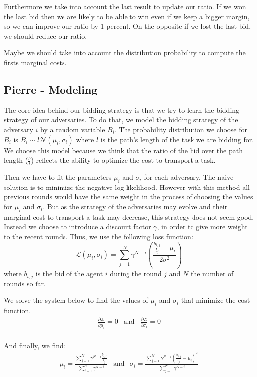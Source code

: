 \documentclass[11pt]{article}
\begin{document}
Furthermore we take into account the last result to update our ratio. If we won the last bid then we are likely to be able to win even if we keep a bigger margin, so we can improve our ratio by 1 percent. On the opposite if we lost the last bid, we should reduce our ratio.

Maybe we should take into account the distribution probability to compute the firsts marginal costs.

\subsection{Pierre - Modeling}

The core idea behind our bidding strategy is that we try to learn the bidding strategy of our adversaries. To do that, we model the bidding strategy of the adversary $i$ by a random variable $B_i$. The probability distribution we choose for $B_i$ is $B_i \sim l\mathcal{N}(\mu_i, \sigma_i)$ where $l$ is the path's length of the task we are bidding for. We choose this model because we think that the ratio of the bid over the path length ($\frac{b}{l}$) reflects the ability to optimize the cost to transport a task.

Then we have to fit the parameters $\mu_i$ and $\sigma_i$ for each adversary. The naive solution is to minimize the negative log-likelihood. However with this method all previous rounds would have the same weight in the process of choosing the values for $\mu_i$ and $\sigma_i$. But as the strategy of the adversaries may evolve and their marginal cost to transport a task may decrease, this strategy does not seem good. Instead we choose to introduce a discount factor $\gamma$, in order to give more weight to the recent rounds. Thus, we use the following loss function:
$$
\mathcal{L}(\mu_i, \sigma_i) = \sum_{j=1}^{N}{\gamma^{N-i}\left(\frac{\frac{b_{i,j}}{l_j} - \mu_i}{2\sigma^2}\right)}
$$
where $b_{i,j}$ is the bid of the agent $i$ during the round $j$ and $N$ the number of rounds so far.

We solve the system below to find the values of $\mu_i$ and $\sigma_i$ that minimize the cost function.
$$
\begin{array}{ccc}
\frac{\partial \mathcal{L}}{\partial \mu_i} = 0 & 
\text{and} &
\frac{\partial \mathcal{L}}{\partial \sigma_i} = 0 \\
\end{array}
$$

And finally, we find:
\begin{equation}
\begin{array}{ccc}
\mu_i = \frac{\sum_{j = 1}^{N}{\gamma^{N-i}\frac{b_{i,j}}{l_j}}}{\sum_{j = 1}^{N}{\gamma^{N-i}}} &
\text{and} &
\sigma_i = \frac{\sum_{j = 1}^{N}{\gamma^{N-i}\left(\frac{b_{i,j}}{l_j}-\mu_i\right)^2}}{\sum_{j = 1}^{N}{\gamma^{N-i}}} \\
\end{array}
\label{update}
\end{equation}
\end{document}
